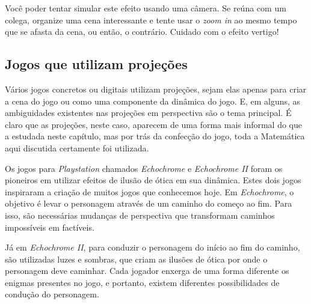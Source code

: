 Você poder tentar simular este efeito usando uma câmera. Se reúna com um colega, organize uma cena interessante e tente usar o \emph{zoom in} ao mesmo tempo que se afasta da cena, ou então, o contrário. Cuidado com o efeito vertigo!


\subsection{Jogos que utilizam projeções}
\label{\detokenize{GE301-A:jogos-que-utilizam-projecoes}}\label{\detokenize{GE301-A:sub-jogos}}
Vários jogos concretos ou digitais utilizam projeções, sejam elas apenas para criar a cena do jogo ou como uma componente da dinâmica do jogo. E, em alguns, as ambiguidades existentes nas projeções em perspectiva são o tema principal.  É claro que as projeções, neste caso, aparecem de uma forma mais informal do que a estudada neste capítulo, mas por trás da confecção do jogo, toda a Matemática aqui discutida certamente foi utilizada.

Os jogos para \emph{Playstation} chamados \emph{Echochrome} e \emph{Echochrome II} foram os pioneiros em utilizar efeitos de ilusão de ótica em sua dinâmica. Estes dois jogos inspiraram a criação de muitos jogos que conhecemos hoje. Em \emph{Echochrome}, o objetivo é levar o personagem através de um caminho do começo ao fim. Para isso, são necessárias mudanças de perspectiva que transformam caminhos impossíveis em factíveis.



Já em \emph{Echochrome II}, para conduzir o personagem do início ao fim do caminho, são utilizadas luzes e sombras, que criam as ilusões de ótica por onde o personagem deve caminhar. Cada jogador enxerga de uma forma diferente os enigmas presentes no jogo, e portanto, existem diferentes possibilidades de condução do personagem.



